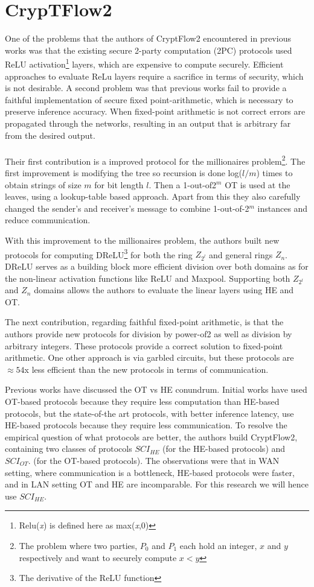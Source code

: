 \documentclass[../thesis.tex]{subfiles}
\begin{document}
\section{CrypTFlow2}
One of the problems that the authors of CryptFlow2 encountered in previous works was that the existing secure 2-party computation (2PC) protocols used ReLU activation\footnote{Relu(\textit{x}) is defined here as max(\textit{x},0)} layers, which are expensive to compute securely. Efficient approaches to evaluate ReLu layers require a sacrifice in terms of security, which is not desirable. A second problem was that previous works fail to provide a faithful implementation of secure fixed point-arithmetic, which is necessary to preserve inference accuracy. When fixed-point arithmetic is not correct errors are propagated through the networks, resulting in an output that is arbitrary far from  the desired output. \paragraph{}

Their first contribution is a improved protocol for the millionaires problem\footnote{The problem where two parties, $P_0$ and $P_1$ each hold an integer, $x$ and $y$ respectively and want to securely compute $x<y$}. The first improvement is modifying the tree so recursion is done log($l/m$) times to obtain strings of size $m$ for bit length $l$. Then a 1-out-of2$^m$ OT is used at the leaves, using a lookup-table based approach. Apart from this they also carefully changed the sender's and receiver's message to combine 1-out-of-2$^m$ instances and reduce communication.  

With this improvement to the millionaires problem, the authors built new protocols for computing DReLU\footnote{The derivative of the ReLU function} for both the ring $Z_{2^l}$ and general rings $Z_n$. DReLU serves as a building block more efficient division over both domains as for the non-linear activation functions like ReLU and Maxpool. Supporting both $Z_{2^l}$ and $Z_n$ domains allows the authors to evaluate the linear layers using HE and OT. 

The next contribution, regarding faithful fixed-point arithmetic, is that the authors provide new protocols for division by power-of2 as well as division by arbitrary integers. These protocols provide a correct solution to fixed-point arithmetic. One other approach is via garbled circuits, but these protocols are $\approx 54$x less efficient than the new protocols in terms of communication. 

Previous works have discussed the OT vs HE conundrum. Initial works have used OT-based protocols because they require less computation than HE-based protocols, but the state-of-the art protocols, with better inference latency, use HE-based protocols because they require less communication. To resolve the empirical question of what protocols are better, the authors build CryptFlow2, containing two classes of protocols $SCI_{HE}$ (for the HE-based protocols) and $SCI_{OT}$. (for the OT-based protocols). The observations were that in WAN setting, where communication is a bottleneck, HE-based protocols were faster, and in LAN setting OT and HE are incomparable. For this research we will hence use $SCI_{HE}$.
\end{document}
